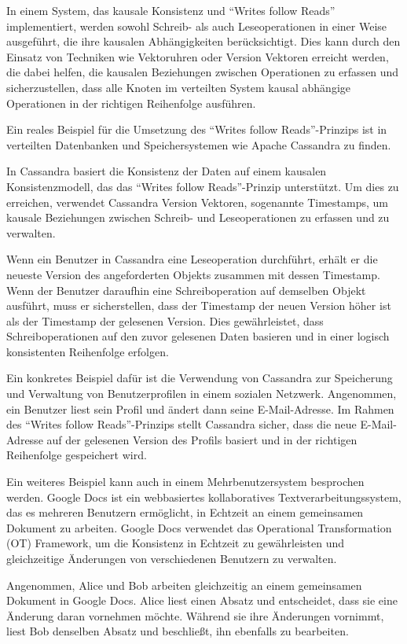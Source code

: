 \documentclass[../vs-script-first-v01.tex]{subfiles}
\begin{document}
In einem System, das kausale Konsistenz und \enquote{Writes follow Reads} implementiert, werden sowohl Schreib- als auch Leseoperationen in einer Weise ausgeführt, die ihre kausalen Abhängigkeiten berücksichtigt. Dies kann durch den Einsatz von Techniken wie Vektoruhren oder Version Vektoren erreicht werden, die dabei helfen, die kausalen Beziehungen zwischen Operationen zu erfassen und sicherzustellen, dass alle Knoten im verteilten System kausal abhängige Operationen in der richtigen Reihenfolge ausführen.

Ein reales Beispiel für die Umsetzung des \enquote{Writes follow Reads}-Prinzips ist in verteilten Datenbanken und Speichersystemen wie Apache Cassandra zu finden. 

In Cassandra basiert die Konsistenz der Daten auf einem kausalen Konsistenzmodell, das das \enquote{Writes follow Reads}-Prinzip unterstützt. Um dies zu erreichen, verwendet Cassandra Version Vektoren, sogenannte Timestamps, um kausale Beziehungen zwischen Schreib- und Leseoperationen zu erfassen und zu verwalten.

Wenn ein Benutzer in Cassandra eine Leseoperation durchführt, erhält er die neueste Version des angeforderten Objekts zusammen mit dessen Timestamp. Wenn der Benutzer daraufhin eine Schreiboperation auf demselben Objekt ausführt, muss er sicherstellen, dass der Timestamp der neuen Version höher ist als der Timestamp der gelesenen Version. Dies gewährleistet, dass Schreiboperationen auf den zuvor gelesenen Daten basieren und in einer logisch konsistenten Reihenfolge erfolgen.

Ein konkretes Beispiel dafür ist die Verwendung von Cassandra zur Speicherung und Verwaltung von Benutzerprofilen in einem sozialen Netzwerk. Angenommen, ein Benutzer liest sein Profil und ändert dann seine E-Mail-Adresse. Im Rahmen des \enquote{Writes follow Reads}-Prinzips stellt Cassandra sicher, dass die neue E-Mail-Adresse auf der gelesenen Version des Profils basiert und in der richtigen Reihenfolge gespeichert wird.

Ein weiteres Beispiel kann auch in einem Mehrbenutzersystem besprochen werden. Google Docs ist ein webbasiertes kollaboratives Textverarbeitungssystem, das es mehreren Benutzern ermöglicht, in Echtzeit an einem gemeinsamen Dokument zu arbeiten. Google Docs verwendet das Operational Transformation (OT) Framework, um die Konsistenz in Echtzeit zu gewährleisten und gleichzeitige Änderungen von verschiedenen Benutzern zu verwalten.

Angenommen, Alice und Bob arbeiten gleichzeitig an einem gemeinsamen Dokument in Google Docs. Alice liest einen Absatz und entscheidet, dass sie eine Änderung daran vornehmen möchte. Während sie ihre Änderungen vornimmt, liest Bob denselben Absatz und beschließt, ihn ebenfalls zu bearbeiten.
\end{document}
